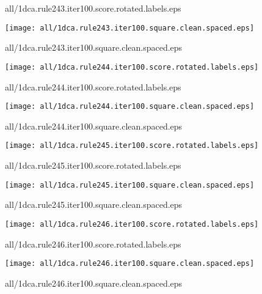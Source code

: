 \documentclass{article}
\begin{document}
{\footnotesize all/1dca.rule243.iter100.score.rotated.labels.eps}
\begin{center}
\begin{minipage}{\textwidth}
\texttt{[image: all/1dca.rule243.iter100.square.clean.spaced.eps]}
\end{minipage}
\end{center}
{\footnotesize all/1dca.rule243.iter100.square.clean.spaced.eps}
\begin{center}
\begin{minipage}{\textwidth}
\texttt{[image: all/1dca.rule244.iter100.score.rotated.labels.eps]}
\end{minipage}
\end{center}
{\footnotesize all/1dca.rule244.iter100.score.rotated.labels.eps}
\begin{center}
\begin{minipage}{\textwidth}
\texttt{[image: all/1dca.rule244.iter100.square.clean.spaced.eps]}
\end{minipage}
\end{center}
{\footnotesize all/1dca.rule244.iter100.square.clean.spaced.eps}
\begin{center}
\begin{minipage}{\textwidth}
\texttt{[image: all/1dca.rule245.iter100.score.rotated.labels.eps]}
\end{minipage}
\end{center}
{\footnotesize all/1dca.rule245.iter100.score.rotated.labels.eps}
\begin{center}
\begin{minipage}{\textwidth}
\texttt{[image: all/1dca.rule245.iter100.square.clean.spaced.eps]}
\end{minipage}
\end{center}
{\footnotesize all/1dca.rule245.iter100.square.clean.spaced.eps}
\begin{center}
\begin{minipage}{\textwidth}
\texttt{[image: all/1dca.rule246.iter100.score.rotated.labels.eps]}
\end{minipage}
\end{center}
{\footnotesize all/1dca.rule246.iter100.score.rotated.labels.eps}
\begin{center}
\begin{minipage}{\textwidth}
\texttt{[image: all/1dca.rule246.iter100.square.clean.spaced.eps]}
\end{minipage}
\end{center}
{\footnotesize all/1dca.rule246.iter100.square.clean.spaced.eps}
\end{document}

